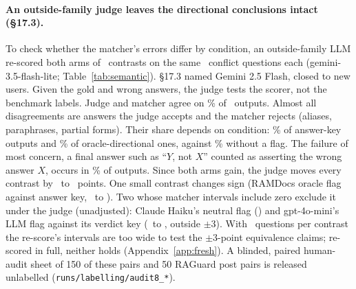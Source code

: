 \paragraph{An outside-family judge leaves the directional conclusions intact (\S17.3).} To
check whether the matcher's errors differ by condition, an outside-family LLM re-scored both
arms of \semK\ contrasts on the same \semNq\ conflict questions each (gemini-3.5-flash-lite; Table~\ref{tab:semantic}).
\S17.3 named Gemini 2.5 Flash, closed to new users. Given the gold and wrong answers, the judge tests the
scorer, not the benchmark labels. Judge and matcher agree on \semAgree\% of \semN\ outputs. Almost all
disagreements are answers the judge accepts and the matcher rejects (aliases, paraphrases, partial forms).
Their share depends on condition: \semJudgeOnlyKey\% of answer-key outputs and \semJudgeOnlyDir\% of oracle-directional ones,
against \semJudgeOnlyPlain\% without a flag. The failure of most concern, a final answer such as
``$Y$, not $X$'' counted as asserting the wrong answer $X$, occurs in \semRejected\% of outputs. Since
both arms gain, the judge moves every contrast by \semDidMin\ to \semDidMax\ points. One small contrast changes sign (RAMDocs oracle flag against answer key, \semTwentyThreeRDMiniM\ to \semTwentyThreeRDMiniJ).
Two whose matcher intervals include zero exclude it under the judge (unadjusted): Claude Haiku's neutral flag
(\semNeuCBsHaikuJ) and gpt-4o-mini's LLM flag against its verdict key (\semThirtyCBsMiniM\ to \semThirtyCBsMiniJ, outside $\pm$3). With \semNq\ questions per contrast the re-score's
intervals are too wide to test the $\pm$3-point equivalence claims; re-scored in full, neither holds
(Appendix~\ref{app:fresh}). A blinded, paired human-audit sheet of
150 of these pairs and 50 RAGuard post pairs is released unlabelled (\texttt{runs/labelling/audit8\_*}).


